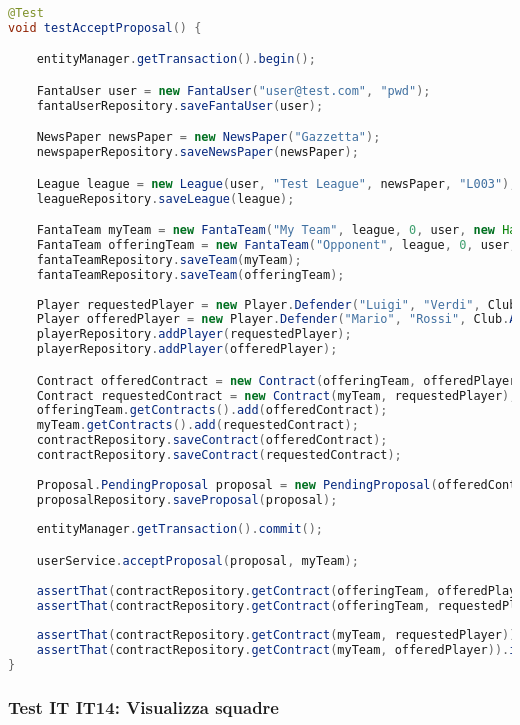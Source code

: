 \begin{lstlisting}[language=Java]
@Test
void testAcceptProposal() {

	entityManager.getTransaction().begin();

	FantaUser user = new FantaUser("user@test.com", "pwd");
	fantaUserRepository.saveFantaUser(user);

	NewsPaper newsPaper = new NewsPaper("Gazzetta");
	newspaperRepository.saveNewsPaper(newsPaper);

	League league = new League(user, "Test League", newsPaper, "L003");
	leagueRepository.saveLeague(league);

	FantaTeam myTeam = new FantaTeam("My Team", league, 0, user, new HashSet<>());
	FantaTeam offeringTeam = new FantaTeam("Opponent", league, 0, user, new HashSet<>());
	fantaTeamRepository.saveTeam(myTeam);
	fantaTeamRepository.saveTeam(offeringTeam);
		
	Player requestedPlayer = new Player.Defender("Luigi", "Verdi", Club.BOLOGNA);
	Player offeredPlayer = new Player.Defender("Mario", "Rossi", Club.ATALANTA);
	playerRepository.addPlayer(requestedPlayer);
	playerRepository.addPlayer(offeredPlayer);

	Contract offeredContract = new Contract(offeringTeam, offeredPlayer);
	Contract requestedContract = new Contract(myTeam, requestedPlayer);
	offeringTeam.getContracts().add(offeredContract);
	myTeam.getContracts().add(requestedContract);
	contractRepository.saveContract(offeredContract);
	contractRepository.saveContract(requestedContract);
		
	Proposal.PendingProposal proposal = new PendingProposal(offeredContract, requestedContract);
	proposalRepository.saveProposal(proposal);
		
	entityManager.getTransaction().commit();

	userService.acceptProposal(proposal, myTeam);
		
	assertThat(contractRepository.getContract(offeringTeam, offeredPlayer)).isEmpty();
	assertThat(contractRepository.getContract(offeringTeam, requestedPlayer)).isPresent();
		
	assertThat(contractRepository.getContract(myTeam, requestedPlayer)).isEmpty();
	assertThat(contractRepository.getContract(myTeam, offeredPlayer)).isPresent();
}
\end{lstlisting}


\subsubsection{Test IT IT14: Visualizza squadre} \label{IT14}

